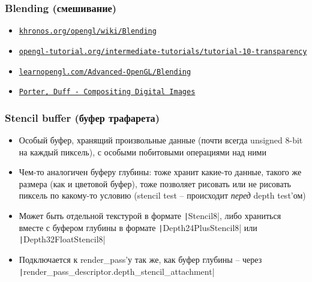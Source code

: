 \documentclass[10pt]{beamer}
\begin{document}
\begin{frame}[fragile]
\frametitle{Blending (смешивание)}
\begin{itemize}
\item \href{https://www.khronos.org/opengl/wiki/Blending}{\texttt{khronos.org/opengl/wiki/Blending}}
\item \href{http://www.opengl-tutorial.org/intermediate-tutorials/tutorial-10-transparency/}{\texttt{opengl-tutorial.org/intermediate-tutorials/tutorial-10-transparency}}
\item \href{https://learnopengl.com/Advanced-OpenGL/Blending}{\texttt{learnopengl.com/Advanced-OpenGL/Blending}}
\item \href{https://graphics.pixar.com/library/Compositing/paper.pdf}{\texttt{Porter, Duff - Compositing Digital Images}}
\end{itemize}
\end{frame}

\begin{frame}[fragile]
\frametitle{Stencil buffer (буфер трафарета)}
\begin{itemize}
\item Особый буфер, хранящий произвольные данные (почти всегда unsigned 8-bit на каждый пиксель), с особыми побитовыми операциями над ними
\pause
\item Чем-то аналогичен буферу глубины: тоже хранит какие-то данные, такого же размера (как и цветовой буфер), тоже позволяет рисовать или не рисовать пиксель по какому-то условию (stencil test -- происходит \textit{перед} depth test'ом)
\pause
\item Может быть отдельной текстурой в формате \texttt|Stencil8|, либо храниться вместе с буфером глубины в формате \texttt|Depth24PlusStencil8| или \texttt|Depth32FloatStencil8|
\pause
\item Подключается к render\_pass'у так же, как буфер глубины -- через \texttt|render_pass_descriptor.depth_stencil_attachment|
\end{itemize}
\end{frame}
\end{document}
